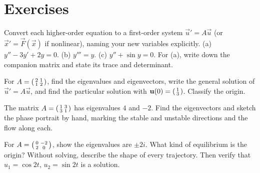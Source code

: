 \section{Exercises}
\label{ch39:exercises}

\begin{exercise}
Convert each higher-order equation to a first-order system $\vec u' = A\vec u$
(or $\vec x' = \vec F(\vec x)$ if nonlinear), naming your new variables
explicitly. (a) $y'' - 3y' + 2y = 0$. (b) $y''' = y$. (c) $y'' + \sin y = 0$.
For (a), write down the companion matrix and state its trace and determinant.
\end{exercise}

\begin{exercise}
For $A = \begin{psmallmatrix} 2 & 1 \\ 1 & 2\end{psmallmatrix}$, find the
eigenvalues and eigenvectors, write the general solution of $\vec u' = A\vec u$,
and find the particular solution with $\vec u(0) = \begin{psmallmatrix} 1 \\
3\end{psmallmatrix}$. Classify the origin.
\end{exercise}

\begin{exercise}[A saddle]
The matrix $A = \begin{psmallmatrix} 1 & 3 \\ 3 & 1\end{psmallmatrix}$ has
eigenvalues $4$ and $-2$. Find the eigenvectors and sketch the phase portrait by
hand, marking the stable and unstable directions and the flow along each.
\end{exercise}

\begin{exercise}
For $A = \begin{psmallmatrix} 0 & -2 \\ 2 & 0\end{psmallmatrix}$, show the
eigenvalues are $\pm 2i$. What kind of equilibrium is the origin? Without solving,
describe the shape of every trajectory. Then verify that $u_1 = \cos 2t$, $u_2 =
\sin 2t$ is a solution.
\end{exercise}

